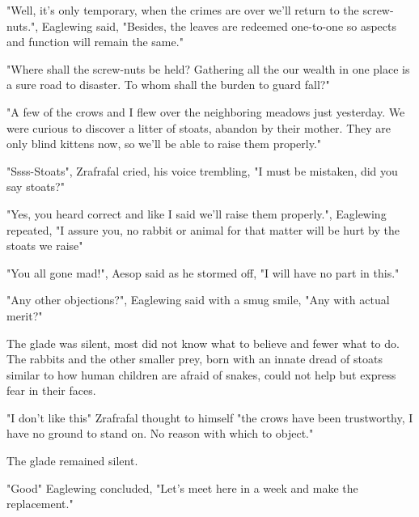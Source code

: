 \documentclass[smalldemyvopaper,11pt,twoside,onecolumn,openright,extrafontsizes]{memoir}
\begin{document}
"Well, it's only temporary, when the crimes are over we'll return to the screw-nuts.", Eaglewing said, "Besides, the leaves are redeemed one-to-one so aspects and function will remain the same."

"Where shall the screw-nuts be held? Gathering all the our wealth in one place is a sure road to disaster. To whom shall the burden to guard fall?"

"A few of the crows and I flew over the neighboring meadows just yesterday. We were curious to discover a litter of stoats, abandon by their mother. They are only blind kittens now, so we'll be able to raise them properly."


"Ssss-Stoats", Zrafrafal cried, his voice trembling, "I must be mistaken, did you say stoats?"

"Yes, you heard correct and like I said we'll raise them properly.", Eaglewing repeated, "I assure you, no rabbit or animal for that matter will be hurt by the stoats we raise"

"You all gone mad!", Aesop said as he stormed off, "I will have no part in this."

"Any other objections?", Eaglewing said with a smug smile, "Any with actual merit?" 

The glade was silent, most did not know what to believe and fewer what to do. The rabbits and the other smaller prey, born with an innate dread of stoats similar to how human children are afraid of snakes, could not help but express fear in their faces. 

"I don't like this" Zrafrafal thought to himself "the crows have been trustworthy, I have no ground to stand on. No reason with which to object." 

The glade remained silent.

"Good" Eaglewing concluded, "Let's meet here in a week and make the replacement."
\end{document}
